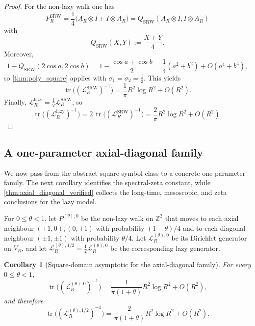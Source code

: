 \documentclass[reqno]{amsart}
\numberwithin{equation}{section}
\newtheorem{corollary}[corollary]{Corollary}
\theoremstyle{definition}
\theoremstyle{remark}
\newcommand{\Cref}[1]{\autoref{#1}}
\DeclareMathOperator{\tr}{tr}
\begin{document}
\begin{proof}
For the non-lazy walk one has
\[
  P_R^{\mathrm{SRW}}
  =
  \frac14\bigl(A_R\otimes I+I\otimes A_R\bigr)
  =
  Q_{\mathrm{SRW}}(A_R\otimes I,I\otimes A_R)
\]
with
\[
  Q_{\mathrm{SRW}}(X,Y):=\frac{X+Y}{4}.
\]
Moreover,
\[
  1-Q_{\mathrm{SRW}}(2\cos a,2\cos b)
  =
  1-\frac{\cos a+\cos b}{2}
  =
  \frac14(a^2+b^2)+O(a^4+b^4),
\]
so \Cref{thm:poly_square} applies with $\sigma_1=\sigma_2=\tfrac12$. This yields
\[
  \tr\!\bigl((\mathcal{L}_{R}^{\mathrm{SRW}})^{-1}\bigr)
  =
  \frac{1}{\pi}R^2\log R^2+O(R^2).
\]
Finally, $\mathcal{L}_{R}^{\mathrm{lazy}}=\frac12\mathcal{L}_{R}^{\mathrm{SRW}}$, so
\[
\tr\!\bigl((\mathcal{L}_{R}^{\mathrm{lazy}})^{-1}\bigr)
=2\,\tr\!\bigl((\mathcal{L}_{R}^{\mathrm{SRW}})^{-1}\bigr)
=\frac{2}{\pi}R^2\log R^2+O(R^2).
\]
\end{proof}

\subsection{A one-parameter axial-diagonal family}\label{app:king}

We now pass from the abstract square-symbol class to a concrete one-parameter family. The next corollary identifies the spectral-zeta constant, while \Cref{thm:axial_diagonal_verified} collects the long-time, mesoscopic, and zeta conclusions for the lazy model.

For $0\le \theta<1$, let $P^{(\theta),0}$ be the non-lazy walk on $\mathbb Z^2$ that moves to each axial neighbour $(\pm1,0),(0,\pm1)$ with probability $(1-\theta)/4$ and to each diagonal neighbour $(\pm1,\pm1)$ with probability $\theta/4$. Let $\mathcal L_R^{(\theta),0}$ be its Dirichlet generator on $V_R$, and let $\mathcal L_R^{(\theta),1/2}=\frac12\mathcal L_R^{(\theta),0}$ be the corresponding lazy generator.

\begin{corollary}[Square-domain asymptotic for the axial-diagonal family]\label{cor:axial_diagonal_square}
For every $0\le \theta<1$,
\[
\tr\!\bigl((\mathcal L_R^{(\theta),0})^{-1}\bigr)
=\frac{1}{\pi(1+\theta)}R^2\log R^2+O(R^2),
\]
and therefore
\[
\tr\!\bigl((\mathcal L_R^{(\theta),1/2})^{-1}\bigr)
=\frac{2}{\pi(1+\theta)}R^2\log R^2+O(R^2).
\]
\end{corollary}
\end{document}
